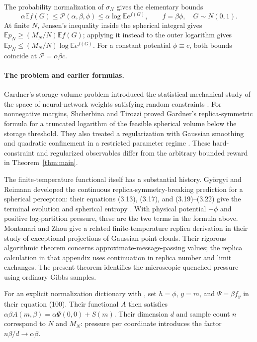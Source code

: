 \documentclass[11pt]{article}
\newcommand{\E}{\mathbb E}
\begin{document}
The probability normalization of $\sigma_N$ gives the elementary bounds
\[
 \alpha\E f(G)\le\mathcal P(\alpha,\beta,\phi)
       \le\alpha\log\E e^{f(G)},\qquad
 f=\beta\phi,\quad G\sim N(0,1).
\]
At finite $N$, Jensen's inequality inside the spherical integral gives
$\E p_N\ge(M_N/N)\E f(G)$; applying it instead to the outer logarithm
gives $\E p_N\le(M_N/N)\log\E e^{f(G)}$.
For a constant potential $\phi\equiv c$, both bounds coincide at
$\mathcal P=\alpha\beta c$.

\paragraph{The problem and earlier formulas.}
Gardner's storage-volume problem introduced the statistical-mechanical study
of the space of neural-network weights satisfying random constraints
\cite{Gardner1988}. For nonnegative margins, Shcherbina and Tirozzi proved Gardner's
replica-symmetric formula for a truncated logarithm of the feasible spherical
volume below the storage threshold. They also treated a regularization with
Gaussian smoothing and quadratic confinement in a restricted parameter regime
\cite[Theorems~2 and~3]{ShcherbinaTirozzi2003}. These hard-constraint and
regularized observables differ from the arbitrary bounded reward in
Theorem~\ref{thm:main}.

The finite-temperature functional itself has a substantial history.
Gy\"orgyi and Reimann developed the continuous replica-symmetry-breaking
prediction for a spherical perceptron: their equations (3.13), (3.17), and
(3.19)--(3.22) give the terminal evolution and spherical entropy
\cite{GyorgyiReimann2000}. With physical potential $-\phi$ and positive
log-partition pressure, these are the two terms in the formula above.
Montanari and Zhou give a related finite-temperature replica derivation
\cite[Appendix~B]{MontanariZhou2024} in their study of exceptional projections
of Gaussian point clouds. Their rigorous algorithmic theorem concerns
approximate-message-passing values; the replica calculation in that appendix
uses continuation in replica number and limit exchanges. The present theorem
identifies the microscopic quenched pressure using ordinary Gibbs samples.

For an explicit normalization dictionary with \cite{MontanariZhou2024}, set
$h=\phi$, $y=m$, and $\Psi=\beta f_y$ in their equation (100). Their functional
$A$ then satisfies $\alpha\beta A(m,\beta)=\alpha\Psi(0,0)+S(m)$.
Their dimension $d$ and sample count $n$ correspond to $N$ and $M_N$:
pressure per coordinate introduces the factor $n\beta/d\to\alpha\beta$.
\end{document}
